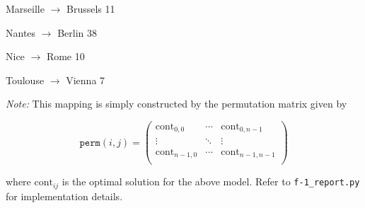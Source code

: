 \documentclass[8pt,oneside]{extarticle}
\begin{document}
Marseille $\rightarrow$ Brussels 11

Nantes $\rightarrow$ Berlin 38

Nice $\rightarrow$ Rome 10

Toulouse $\rightarrow$ Vienna 7

\medskip
\emph{Note:} This mapping is simply constructed by the permutation matrix given by

$$\texttt{perm}(i,j) = 
\begin{pmatrix}
    \mathrm{cont}_{0,0} & \cdots & \mathrm{cont}_{0,n-1} \\
    \vdots & \ddots & \vdots \\
    \mathrm{cont}_{n-1,0} & \cdots & \mathrm{cont}_{n-1,n-1} \\
\end{pmatrix}
$$

where $\mathrm{cont}_{ij}$ is the optimal solution for the above model. Refer to \texttt{f-1\_report.py}
for implementation details.
\end{document}
